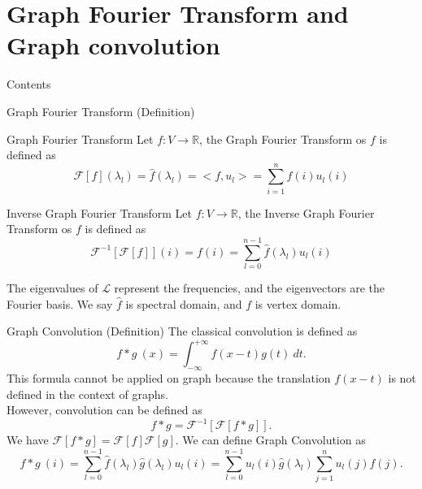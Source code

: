 \documentclass{beamer}
\begin{document}
	\section[Graph Fourier Transform]{Graph Fourier Transform and Graph convolution}
	\begin{frame}{Contents}
		\small
	\end{frame}
	\begin{frame}{Graph Fourier Transform (Definition)}
		\begin{block}{Graph Fourier Transform}
			Let $f: V \rightarrow \mathbb{R}$, the Graph Fourier Transform os $f$ is defined as
			\[
			\mathcal{F}[f](\lambda_l) = \hat{f}(\lambda_l) = <f, u_l> = \sum_{i=1}^{n}f(i)u_l(i)
			\]
		\end{block}
		\begin{block}{Inverse Graph Fourier Transform}
			Let $f: V \rightarrow \mathbb{R}$, the Inverse Graph Fourier Transform os $f$ is defined as
			\[
			\mathcal{F}^{-1}[\mathcal{F}[f]](i) = f(i) = \sum_{l=0}^{n-1}\hat{f}(\lambda_l)u_l(i)
			\]
		\end{block}
		The eigenvalues of $\mathcal{L}$ represent the frequencies, and the eigenvectors are the Fourier basis. We say $\hat{f}$ is spectral domain, and $f$ is vertex domain. 
	\end{frame}
	
	\begin{frame}{Graph Convolution (Definition)}
		The classical convolution is defined as
		\[
		f*g\ (x) = \int_{-\infty}^{+\infty}f(x-t)g(t)\ dt.
		\]
		This formula cannot be applied on graph because the translation $f(x-t)$ is not defined in the context of graphs.\\
		However, convolution can be defined as
		\[
		f*g = \mathcal{F}^{-1}[\mathcal{F}[f*g]].
		\]
		We have $\mathcal{F}[f*g] = \mathcal{F}[f]\mathcal{F}[g]$. We can define Graph Convolution as
		\[
		f*g\ (i) = \sum_{l=0}^{n-1}\hat{f}(\lambda_l)\hat{g}(\lambda_l)u_l(i) = \sum_{l=0}^{n-1} u_l(i)\hat{g}(\lambda_l)\sum_{j=1}^{n}u_l(j)f(j).
		\]
	\end{frame}
	
\end{document}

